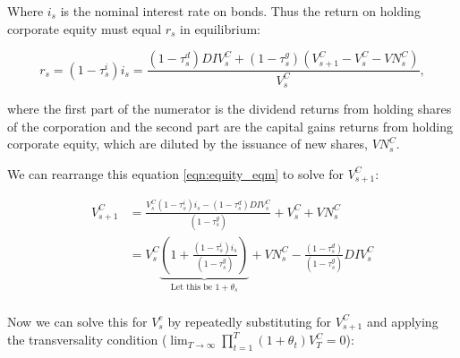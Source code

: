 \documentclass[article,11pt,letterpaper,fleqn]{article}
\theoremstyle{definition}
\numberwithin{equation}{section}
\begin{document}
\noindent\noindent Where $i_{s}$ is the nominal interest rate on bonds.  Thus the return on holding corporate equity must equal $r_{s}$ in equilibrium:

\begin{equation}
\label{eqn:equity_eqm}
r_{s}=(1-\tau^{i}_{s})i_{s}=\frac{(1-\tau^{d}_{s})DIV^{C}_{s}+(1-\tau^{g}_{s})(V^{C}_{s+1}-V^{C}_{s}-VN^{C}_{s})}{V^{C}_{s}},
\end{equation}

where the first part of the numerator is the dividend returns from holding shares of the corporation and the second part are the capital gains returns from holding corporate equity, which are diluted by the issuance of new shares, $VN^{C}_{s}$.

We can rearrange this equation \ref{eqn:equity_eqm} to solve for $V^{C}_{s+1}$:

\begin{equation}
\label{eqn:v_s1}
\begin{split}
V^{C}_{s+1}&=\frac{V^{C}_{s}(1-\tau^{i}_{s})i_{s}-(1-\tau^{d}_{s})DIV^{C}_{s}}{(1-\tau^{g}_{s})}+V^{C}_{s}+VN^{C}_{s} \\
 & = V^{C}_{s}\underbrace{\left(1+\frac{(1-\tau^{i}_{s})i_{s}}{(1-\tau^{g}_{s})}\right)}_{\text{Let this be }1+\theta_{s}} + VN^{C}_{s} - \frac{(1-\tau^{d}_{s})}{(1-\tau^{g}_{s})}DIV^{C}_{s} \\
\end{split}
\end{equation}

\noindent\noindent Now we can solve this for $V^{c}_{s}$ by repeatedly substituting for $V^{C}_{s+1}$ and applying the transversality condition ($\lim_{T \to \infty} \prod_{t=1}^{T}(1+\theta_{t})V^{C}_{T}=0$):
\end{document}
